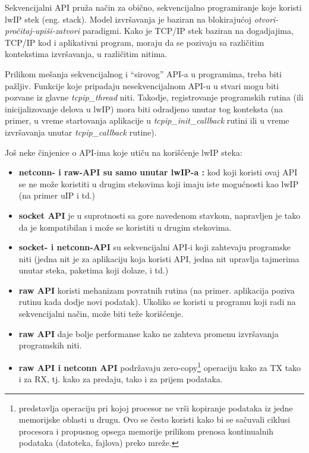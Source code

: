 \documentclass[a4paper,12pt, master]{etf}
\begin{document}
	Sekvencijalni API pru\v{z}a na\v{c}in za obi\v{c}no, sekvencijalno
	programiranje koje koristi lwIP stek (eng\@. stack). Model izvr\v{s}avanja je
    baziran na blokiraju\'{c}oj \textit{otvori-pro\v{c}itaj-upi\v{s}i-zatvori}
	paradigmi. Kako je TCP/IP stek baziran na dogadjajima, TCP/IP kod i
	aplikativni program, moraju da se pozivaju sa razli\v{c}itim kontekstima
	izvr\v{s}avanja, u razli\v{c}itim nitima.

	Prilikom me\v{s}anja sekvencijalnog i ``sirovog'' API-a u programima, treba
	biti pa\v{z}ljiv. Funkcije koje pripadaju nesekvencijalnom API-u u stvari
    mogu biti pozvane iz glavne \textit{tcpip\_thread} niti. Takodje,
    registrovanje programskih rutina (ili inicijalizovanje delova u lwIP) mora
    biti odradjeno unutar tog konteksta (na primer, u vreme startovanja
    aplikacije u \textit{tcpip\_init\_callback} rutini ili u vreme
    izvr\v{s}avanja unutar \textit{tcpip\_callback} rutine).

	Jo\v{s} neke \v{c}injenice o API-ima koje uti\v{c}u na kori\v{s}\'{c}enje
	lwIP steka:
	\begin{itemize}
		\item \textbf{netconn- i raw-API su samo unutar lwIP-a :} kod koji
		koristi ovaj API se	ne mo\v{z}e koristiti u drugim stekovima koji imaju
		iste mogu\'{c}nosti kao lwIP (na primer uIP i td.)
		\item \textbf{socket API} je u suprotnosti sa gore navedenom stavkom,
		napravljen je tako da je kompatibilan i mo\v{z}e se koristiti u drugim
		stekovima.
		\item \textbf{socket- i netconn-API} su sekvencijalni API-i koji
		zahtevaju programske niti (jedna nit je za aplikaciju koja koristi API,
		jedna nit upravlja tajmerima unutar	steka, paketima koji dolaze, i td.)
		\item \textbf{raw API} koristi mehanizam povratnih rutina (na primer\@.
		aplikacija poziva rutinu kada dodje novi podatak). Ukoliko se koristi u
		programu koji radi na sekvencijalni na\v{c}in, mo\v{z}e biti te\v{z}e
		kori\v{s}\'{c}enje.
		\item \textbf{raw API} daje bolje performanse kako ne zahteva promenu
		izvr\v{s}avanja programskih niti.
		\item \textbf{raw API i netconn API} podr\v{z}avaju
		zero-copy\footnote{predstavlja operaciju pri kojoj procesor ne
		vr\v{s}i kopiranje podataka iz jedne memorijske oblasti u drugu. Ovo se
		\v{c}esto koristi kako bi se sa\v{c}uvali ciklusi procesora i propusnog
		opsega memorije prilikom prenosa kontinualnih podataka (datoteka,
		fajlova) preko mre\v{z}e.} operaciju kako za TX tako i za RX, tj\@.
		kako za	predaju, tako i za prijem podataka.
	\end{itemize}
\end{document}
